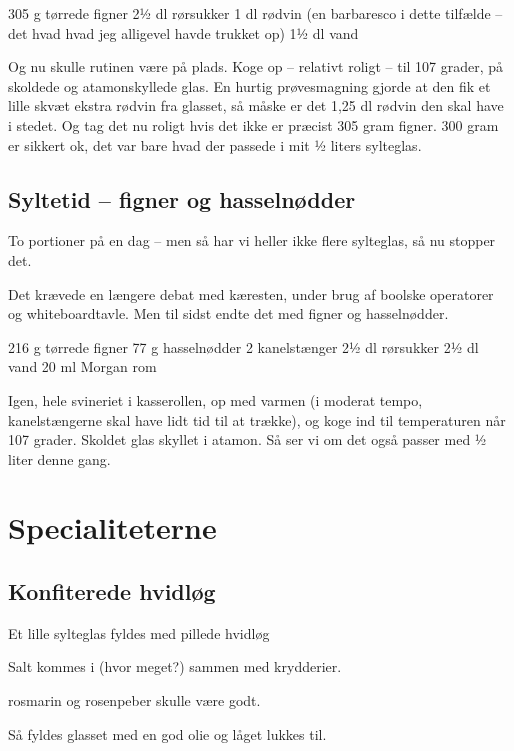 \documentclass[
]{book}
\begin{document}
305 g tørrede figner
2½ dl rørsukker
1 dl rødvin (en barbaresco i dette tilfælde -- det hvad hvad jeg alligevel havde trukket op)
1½ dl vand

Og nu skulle rutinen være på plads. Koge op -- relativt roligt -- til 107 grader, på skoldede og atamonskyllede glas. En hurtig prøvesmagning gjorde at den fik et lille skvæt ekstra rødvin fra glasset, så måske er det 1,25 dl rødvin den skal have i stedet. Og tag det nu roligt hvis det ikke er præcist 305 gram figner. 300 gram er sikkert ok, det var bare hvad der passede i mit ½ liters sylteglas.

\hypertarget{syltetid-figner-og-hasselnuxf8dder}{%
\section{Syltetid -- figner og hasselnødder}\label{syltetid-figner-og-hasselnuxf8dder}}

To portioner på en dag -- men så har vi heller ikke flere sylteglas, så nu stopper det.

Det krævede en længere debat med kæresten, under brug af boolske operatorer og whiteboardtavle. Men til sidst endte det med figner og hasselnødder.

216 g tørrede figner
77 g hasselnødder
2 kanelstænger
2½ dl rørsukker
2½ dl vand
20 ml Morgan rom

Igen, hele svineriet i kasserollen, op med varmen (i moderat tempo, kanelstængerne skal have lidt tid til at trække), og koge ind til temperaturen når 107 grader. Skoldet glas skyllet i atamon. Så ser vi om det også passer med ½ liter denne gang.

\hypertarget{specialiteterne}{%
\chapter{Specialiteterne}\label{specialiteterne}}

\hypertarget{konfiterede-hvidluxf8g}{%
\section{Konfiterede hvidløg}\label{konfiterede-hvidluxf8g}}

Et lille sylteglas fyldes med pillede hvidløg

Salt kommes i (hvor meget?) sammen med krydderier.

rosmarin og rosenpeber skulle være godt.

Så fyldes glasset med en god olie og låget lukkes til.
\end{document}
